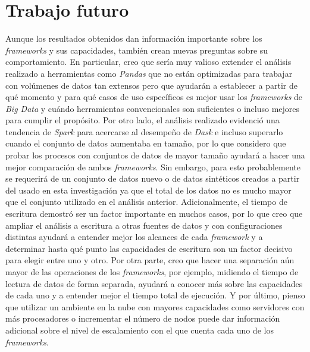 \section{Trabajo futuro}

Aunque los resultados obtenidos dan información importante sobre los \textit{frameworks} y sus capacidades, también crean nuevas preguntas sobre su comportamiento. En particular, creo que sería muy valioso extender el análisis realizado a herramientas como \textit{Pandas} que no están optimizadas para trabajar con volúmenes de datos tan extensos pero que ayudarán a establecer a partir de qué momento y para qué casos de uso específicos es mejor usar los \textit{frameworks} de \textit{Big Data} y cuándo herramientas convencionales son suficientes o incluso mejores para cumplir el propósito. Por otro lado, el análisis realizado evidenció una tendencia de \textit{Spark} para acercarse al desempeño de \textit{Dask} e incluso superarlo cuando el conjunto de datos aumentaba en tamaño, por lo que considero que probar los procesos con conjuntos de datos de mayor tamaño ayudará a hacer una mejor comparación de ambos \textit{frameworks}. Sin embargo, para esto probablemente se requerirá de un conjunto de datos nuevo o de datos sintéticos creados a partir del usado en esta investigación ya que el total de los datos no es mucho mayor que el conjunto utilizado en el análisis anterior. Adicionalmente, el tiempo de escritura demostró ser un factor importante en muchos casos, por lo que creo que ampliar el análisis a escritura a otras fuentes de datos y con configuraciones distintas ayudará a entender mejor los alcances de cada \textit{framework} y a determinar hasta qué punto las capacidades de escritura son un factor decisivo para elegir entre uno y otro. Por otra parte, creo que hacer una separación aún mayor de las operaciones de los \textit{frameworks}, por ejemplo, midiendo el tiempo de lectura de datos de forma separada, ayudará a conocer más sobre las capacidades de cada uno y a entender mejor el tiempo total de ejecución. Y por último, pienso que utilizar un ambiente en la nube con mayores capacidades como servidores con más procesadores o incrementar el número de nodos puede dar información adicional sobre el nivel de escalamiento con el que cuenta cada uno de los \textit{frameworks}.
